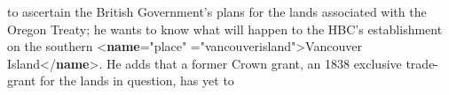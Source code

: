 \begin{shaded}
\hspace*{1em}\hspace*{1em}\hspace*{1em}\hspace*{1em}\hspace*{1em}\hspace*{1em} to ascertain the British Government's plans\mbox{}\newline 
\hspace*{1em}\hspace*{1em}\hspace*{1em}\hspace*{1em}\hspace*{1em}\hspace*{1em} for the lands associated with the Oregon Treaty;\mbox{}\newline 
\hspace*{1em}\hspace*{1em}\hspace*{1em}\hspace*{1em}\hspace*{1em}\hspace*{1em} he wants to know what will happen to the HBC's\mbox{}\newline 
\hspace*{1em}\hspace*{1em}\hspace*{1em}\hspace*{1em}\hspace*{1em}\hspace*{1em} establishment on the southern {<\textbf{name}\hspace*{1em}{type}="{place}"\mbox{}\newline 
\hspace*{1em}\hspace*{1em}\hspace*{1em}\hspace*{1em}\hspace*{1em}{key}="{vancouver\textunderscore island}">}Vancouver Island{</\textbf{name}>}.\mbox{}\newline 
\hspace*{1em}\hspace*{1em}\hspace*{1em}\hspace*{1em}\hspace*{1em}\hspace*{1em} He adds that a former Crown grant, an 1838 exclusive\mbox{}\newline 
\hspace*{1em}\hspace*{1em}\hspace*{1em}\hspace*{1em}\hspace*{1em}\hspace*{1em} trade-grant for the lands in question, has yet to\mbox{}\newline 

\end{shaded}
